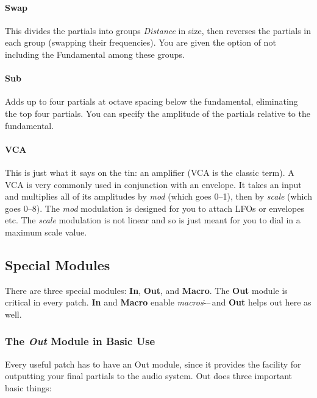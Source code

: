 \documentclass{article}
\begin{document}
\paragraph{Swap} This divides the partials into groups {\it Distance} in size, then reverses the partials in each group (swapping their frequencies).  You are given the option of not including the Fundamental among these groups.

\paragraph{Sub} Adds up to four partials at octave spacing below the fundamental, eliminating the top four partials.  You can specify the amplitude of the partials relative to the fundamental.

\paragraph{VCA} This is just what it says on the tin: an amplifier (VCA is the classic term).  A VCA is very commonly used in conjunction with an envelope.  It takes an input and multiplies all of its amplitudes by {\it mod} (which goes 0--1), then by {\it scale} (which goes 0--8).  The {\it mod} modulation is designed for you to attach LFOs or envelopes etc.  The {\it scale} modulation is not linear and so is just meant for you to dial in a maximum scale value. 

\subsection{Special Modules}


There are three special modules: {\bf In}, {\bf Out}, and {\bf Macro}.  The {\bf Out} module is critical in every patch.  {\bf In} and {\bf Macro} enable {\it macros}\.---\,and {\bf Out} helps out here as well.

\subsubsection{The \textit{Out} Module in Basic Use}  
\label{outmodule}

Every useful patch has to have an Out module, since it provides the facility for outputting your final partials to the audio system.  Out does three important basic things:
\end{document}
